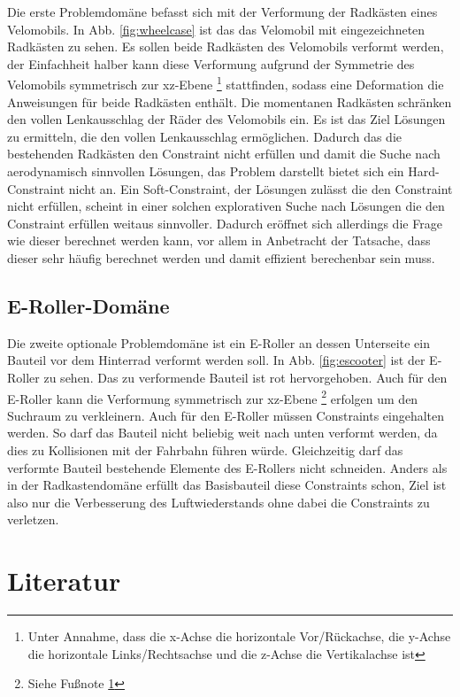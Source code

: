 \documentclass[12pt]{article}
\begin{document}
Die erste Problemdomäne befasst sich mit der Verformung der Radkästen eines Velomobils. 
In Abb. \ref{fig:wheelcase} ist das das Velomobil mit eingezeichneten Radkästen zu sehen.
Es sollen beide Radkästen des Velomobils verformt werden, der Einfachheit halber kann diese Verformung aufgrund der Symmetrie des Velomobils symmetrisch zur xz-Ebene
\footnote{\label{foot:coords} Unter Annahme, dass die x-Achse die horizontale Vor/Rückachse, die y-Achse die horizontale Links/Rechtsachse und die z-Achse die Vertikalachse ist} stattfinden, sodass eine Deformation die Anweisungen für beide Radkästen enthält.
Die momentanen Radkästen schränken den vollen Lenkausschlag der Räder des Velomobils ein.
Es ist das Ziel Lösungen zu ermitteln, die den vollen Lenkausschlag ermöglichen.
Dadurch das die bestehenden Radkästen den Constraint nicht erfüllen und damit die Suche nach aerodynamisch sinnvollen Lösungen, das Problem darstellt bietet sich ein Hard-Constraint nicht an.
Ein Soft-Constraint, der Lösungen zulässt die den Constraint nicht erfüllen, scheint in einer solchen explorativen Suche nach Lösungen die den Constraint erfüllen weitaus sinnvoller.
Dadurch eröffnet sich allerdings die Frage wie dieser berechnet werden kann, vor allem in Anbetracht der Tatsache, dass dieser sehr häufig berechnet werden und damit effizient berechenbar sein muss.

                      
\subsection{E-Roller-Domäne}

Die zweite optionale Problemdomäne ist ein E-Roller an dessen Unterseite ein Bauteil vor dem Hinterrad verformt werden soll.
In Abb. \ref{fig:escooter} ist der E-Roller zu sehen. Das zu verformende Bauteil ist rot hervorgehoben.
Auch für den E-Roller kann die Verformung symmetrisch zur xz-Ebene \footnote{Siehe Fußnote \ref{foot:coords}} erfolgen um den Suchraum zu verkleinern.
Auch für den E-Roller müssen Constraints eingehalten werden. 
So darf das Bauteil nicht beliebig weit nach unten verformt werden, da dies zu Kollisionen mit der Fahrbahn führen würde.
Gleichzeitig darf das verformte Bauteil bestehende Elemente des E-Rollers nicht schneiden.
Anders als in der Radkastendomäne erfüllt das Basisbauteil diese Constraints schon, Ziel ist also nur die Verbesserung des Luftwiederstands ohne dabei die Constraints zu verletzen.
 
\section{Literatur}
\end{document}
